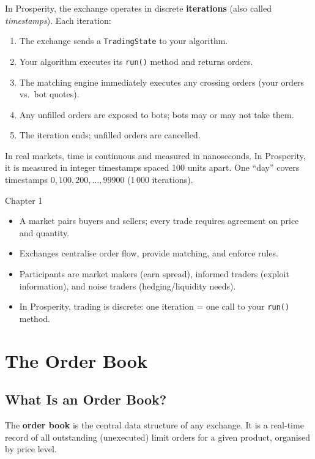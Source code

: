 \documentclass[12pt,a4paper,openany]{report}
\theoremstyle{definition}
\begin{document}
In Prosperity, the exchange operates in discrete \textbf{iterations} (also called \emph{timestamps}). Each iteration:
\begin{enumerate}
  \item The exchange sends a \texttt{TradingState} to your algorithm.
  \item Your algorithm executes its \texttt{run()} method and returns orders.
  \item The matching engine immediately executes any crossing orders (your orders vs.\ bot quotes).
  \item Any unfilled orders are exposed to bots; bots may or may not take them.
  \item The iteration ends; unfilled orders are cancelled.
\end{enumerate}

In real markets, time is continuous and measured in nanoseconds. In Prosperity, it is measured in integer timestamps spaced 100 units apart. One ``day'' covers timestamps $0, 100, 200, \ldots, 99900$ (1\,000 iterations).

\begin{takeawaybox}{Chapter 1}
\begin{itemize}
  \item A market pairs buyers and sellers; every trade requires agreement on price and quantity.
  \item Exchanges centralise order flow, provide matching, and enforce rules.
  \item Participants are market makers (earn spread), informed traders (exploit information), and noise traders (hedging/liquidity needs).
  \item In Prosperity, trading is discrete: one iteration = one call to your \texttt{run()} method.
\end{itemize}
\end{takeawaybox}


\chapter{The Order Book}

\section{What Is an Order Book?}

The \textbf{order book} is the central data structure of any exchange. It is a real-time record of all outstanding (unexecuted) limit orders for a given product, organised by price level.
\end{document}
